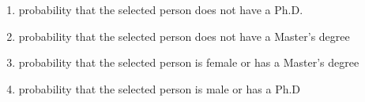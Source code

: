 \begin{exercises}
{\begin{enumerate}
	\item probability that the selected person does not have a Ph.D.
	\item probability that the selected person does not have  a Master's degree
	\item probability that the selected person is female or has a  Master's degree
	\item probability that the selected person is male or has a Ph.D 
\end{enumerate}}

\end{exercises}
